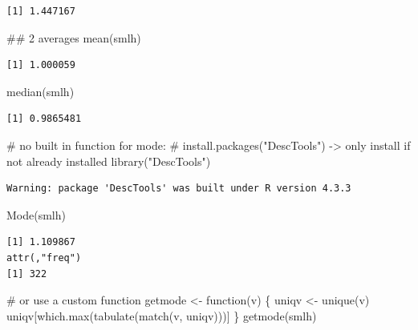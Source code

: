 \documentclass[
  letterpaper,
  DIV=11,
  numbers=noendperiod]{scrreprt}
\newenvironment{Shaded}{}{}
\newcommand{\CommentTok}[1]{\textcolor[rgb]{0.42,0.45,0.49}{#1}}
\newcommand{\ControlFlowTok}[1]{\textcolor[rgb]{0.84,0.23,0.29}{#1}}
\newcommand{\DocumentationTok}[1]{\textcolor[rgb]{0.42,0.45,0.49}{#1}}
\newcommand{\FunctionTok}[1]{\textcolor[rgb]{0.44,0.26,0.76}{#1}}
\newcommand{\NormalTok}[1]{\textcolor[rgb]{0.14,0.16,0.18}{#1}}
\newcommand{\OtherTok}[1]{\textcolor[rgb]{0.44,0.26,0.76}{#1}}
\newcommand{\StringTok}[1]{\textcolor[rgb]{0.01,0.18,0.38}{#1}}
\begin{document}
\begin{tcolorbox}
\begin{verbatim}
[1] 1.447167
\end{verbatim}

\begin{Shaded}
\begin{Highlighting}[]
\DocumentationTok{\#\# 2 averages}
\FunctionTok{mean}\NormalTok{(smlh)}
\end{Highlighting}
\end{Shaded}

\begin{verbatim}
[1] 1.000059
\end{verbatim}

\begin{Shaded}
\begin{Highlighting}[]
\FunctionTok{median}\NormalTok{(smlh)}
\end{Highlighting}
\end{Shaded}

\begin{verbatim}
[1] 0.9865481
\end{verbatim}

\begin{Shaded}
\begin{Highlighting}[]
\CommentTok{\# no built in function for mode:}
\CommentTok{\# install.packages("DescTools") {-}\textgreater{} only install if not already installed}
\FunctionTok{library}\NormalTok{(}\StringTok{"DescTools"}\NormalTok{)}
\end{Highlighting}
\end{Shaded}

\begin{verbatim}
Warning: package 'DescTools' was built under R version 4.3.3
\end{verbatim}

\begin{Shaded}
\begin{Highlighting}[]
\FunctionTok{Mode}\NormalTok{(smlh)}
\end{Highlighting}
\end{Shaded}

\begin{verbatim}
[1] 1.109867
attr(,"freq")
[1] 322
\end{verbatim}

\begin{Shaded}
\begin{Highlighting}[]
\CommentTok{\# or use a custom function}
\NormalTok{getmode }\OtherTok{\textless{}{-}} \ControlFlowTok{function}\NormalTok{(v) \{}
\NormalTok{   uniqv }\OtherTok{\textless{}{-}} \FunctionTok{unique}\NormalTok{(v)}
\NormalTok{   uniqv[}\FunctionTok{which.max}\NormalTok{(}\FunctionTok{tabulate}\NormalTok{(}\FunctionTok{match}\NormalTok{(v, uniqv)))]}
\NormalTok{\}}
\FunctionTok{getmode}\NormalTok{(smlh)}
\end{Highlighting}
\end{Shaded}


\end{tcolorbox}
\end{document}
